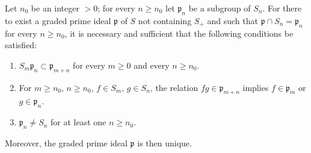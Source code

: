 \begin{proposition}[2.1.9]
\label{II.2.1.9}
Let $n_0$ be an integer $>0$; for every $n\geq n_0$ let $\mathfrak{p}_n$ be
a subgroup of $S_n$. For there to exist a graded prime ideal
$\mathfrak{p}$ of $S$ not containing $S_+$ and such that
$\mathfrak{p}\cap S_n=\mathfrak{p}_n$ for every $n\geq n_0$, it is necessary
and sufficient that the following conditions be satisfied:
\begin{enumerate}
  \item[$1^\circ$] $S_m\mathfrak{p}_n\subset\mathfrak{p}_{m+n}$ for every
    $m\geq 0$ and every $n\geq n_0$.
  \item[$2^\circ$] For $m\geq n_0$, $n\geq n_0$, $f\in S_m$, $g\in S_n$,
    the relation $fg\in\mathfrak{p}_{m+n}$ implies
    $f\in\mathfrak{p}_m$ or $g\in\mathfrak{p}_n$.
  \item[$3^\circ$] $\mathfrak{p}_n\neq S_n$ for at least one $n\geq n_0$.
\end{enumerate}
Moreover, the graded prime ideal $\mathfrak{p}$ is then unique.
\end{proposition}

